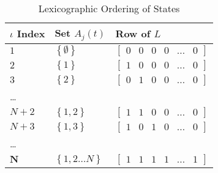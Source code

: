 \documentclass[12pt]{article}
\newcommand{\set}[1]{\ensuremath{\left\{{#1}\right\}}}
\begin{document}
{\small
\begin{table}[h]
	\centering
	\begin{tabularx}{\linewidth}{l | X | X}
	\hline\hline
$\iota$ Index & Set ${A}_{j}(t)$ & Row of $L$\\
\hline
	$1$&$\set{\emptyset}$&$\begin{bmatrix}0& 0& 0& 0& \ldots& 0\end{bmatrix}$\\
	$2$&$\set{1}$&$\begin{bmatrix}1& 0& 0&0& \ldots& 0\end{bmatrix}$\\
	$3$&$\set{2}$&$\begin{bmatrix}0& 1& 0&0& \ldots& 0\end{bmatrix}$\\
	\ldots& &\\
	$N + 2$&$\set{1,2}$&$\begin{bmatrix}1& 1& 0&0& \ldots& 0\end{bmatrix}$\\
	$N+3$&$\set{1, 3}$&$\begin{bmatrix}1& 0& 1& 0&\ldots& 0\end{bmatrix}$\\
	\ldots& &\\
	$\mathbf{N}$&$\set{1, 2 \ldots N}$&$\begin{bmatrix}1& 1& 1& 1&\ldots& 1\end{bmatrix}$\\
\hline
\end{tabularx}
	\caption{Lexicographic Ordering of States}
	\label{tab:lexicographic-comparison}
\end{table}
}
\end{document}
